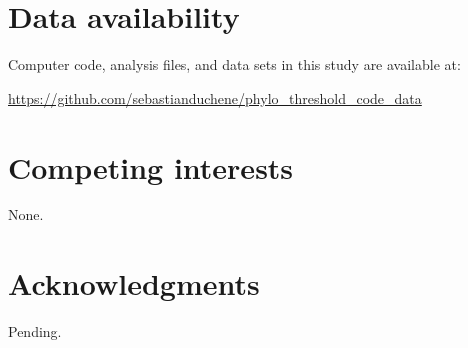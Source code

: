 \documentclass[11pt]{article}
\begin{document}
\section{Data availability}
Computer code, analysis files, and data sets in this study are available at:

\url{https://github.com/sebastianduchene/phylo_threshold_code_data}

\section{Competing interests}
None.


\section{Acknowledgments}
Pending.



%

\end{document}
